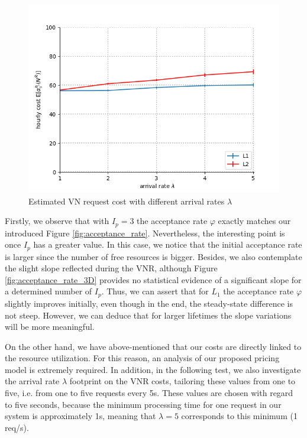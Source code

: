 \begin{figure}[bth]
	\centering
	\includegraphics[scale=0.7]{gfx/ev_pricing.png}    
  	\caption{ Estimated VN request cost with different arrival rates $\lambda$} 
  	\label{fig:pricing}
\end{figure}

Firstly, we observe that with $I_p = 3$ the acceptance rate $\varphi$ exactly matches our introduced Figure \ref{fig:acceptance_rate}. Nevertheless, the interesting point is once $I_p$ has a greater value. In this case, we notice that the initial acceptance rate is larger since the number of free resources is bigger. Besides, we also contemplate the slight slope reflected during the VNR, although Figure \ref{fig:acceptance_rate_3D} provides no statistical evidence of a significant slope for a determined number of $I_p$. Thus, we can assert that for $L_1$ the acceptance rate $\varphi$ slightly improves initially, even though in the end, the steady-state difference is not steep. However, we can deduce that for larger lifetimes the slope variations will be more meaningful.

On the other hand, we have above-mentioned that our costs are directly linked to the resource utilization. For this reason, an analysis of our proposed pricing model is extremely required. In addition, in the following test, we also investigate the arrival rate $\lambda$ footprint on the VNR costs, tailoring these values from one to five, i.e. from one to five requests every 5s. These values are chosen with regard to five seconds, because the minimum processing time for one request in our system is approximately 1s, meaning that $\lambda = 5$ corresponds to this minimum (1 req/s).


